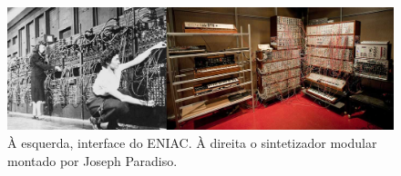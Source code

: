 \begin{figure}
    \caption{\label{analogicos}À esquerda, interface do ENIAC.  À direita o sintetizador modular montado por Joseph Paradiso. }
    
    \includegraphics[width=1\linewidth]{pictures/analogicos}
    
\end{figure}

